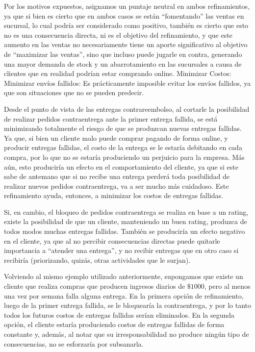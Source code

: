 Por los motivos expuestos, asignamos un puntaje neutral en ambos
refinamientos, ya que si bien es cierto que en ambos casos se están
``fomentando'' las ventas en sucursal, lo cual podría ser considerado como
positivo, también es cierto que esto no es una consecuencia directa, ni es el
objetivo del refinamiento, y que este aumento en las ventas no necesariamente
tiene un aporte significativo al objetivo de ``maximizar las ventas'', sino
que incluso puede jugarle en contra, generando una mayor demanda de stock y un
abarrotamiento en las sucursales a causa de clientes que en realidad podrían
estar comprando online. Minimizar Costos: Minimizar envíos fallidos: Es
prácticamente imposible evitar los envíos fallidos, ya que son situaciones que
no se pueden predecir.

Desde el punto de vista de las entregas contrareembolso, al cortarle la
posibilidad de realizar pedidos contraentrega ante la primer entrega fallida,
se está minimizando totalmente el riesgo de que se produzcan nuevas entregas
fallidas. Ya que, si bien un cliente malo puede comprar pagando de forma
online, y producir entregas fallidas, el costo de la entrega se le estaría
debitando en cada compra, por lo que no se estaría produciendo un perjuicio
para la empresa. Más aún, esto produciría un efecto en el comportamiento del
cliente, ya que si este sabe de antemano que si no recibe una entrega perderá
toda posibilidad de realizar nuevos pedidos contraentrega, va a ser mucho más
cuidadoso. Este refinamiento ayuda, entonces, a minimizar los costos de
entregas fallidas.

Si, en cambio, el bloqueo de pedidos contraentrega se realiza en base a un
rating, existe la posibilidad de que un cliente, manteniendo un buen rating,
produzca de todos modos muchas entregas fallidas. También se produciría un
efecto negativo en el cliente, ya que al no percibir consecuencias directas
puede quitarle importancia a ``atender una entrega'', y no recibir entregas
que en otro caso si recibiría (priorizando, quizás, otras actividades que le
surjan).

Volviendo al mismo ejemplo utilizado anteriormente, supongamos que existe un
cliente que realiza compras que producen ingresos diarios de $\$1000$, pero al
menos una vez por semana falla alguna entrega. En la primera opción de
refinamiento, luego de la primer entrega fallida, se le bloquearía la
contraentrega, y por lo tanto todos los futuros costos de entregas fallidas
serían eliminados. En la segunda opción, el cliente estaría produciendo costos
de entregas fallidas de forma constante y, además, al notar que su
irresponsabilidad no produce ningún tipo de consecuencias, no se esforzaría
por subsanarla.

